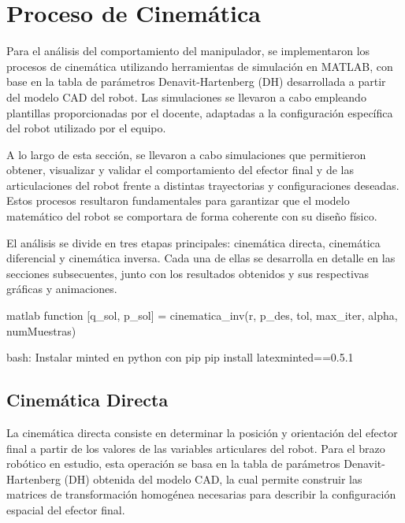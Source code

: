\section{Proceso de Cinemática} \label{sec:proceso_cinematica}

Para el análisis del comportamiento del manipulador, se implementaron los procesos de cinemática utilizando herramientas de simulación en MATLAB, con base en la tabla de parámetros Denavit-Hartenberg (DH) desarrollada a partir del modelo CAD del robot.
Las simulaciones se llevaron a cabo empleando plantillas proporcionadas por el docente, adaptadas a la configuración específica del robot utilizado por el equipo.

A lo largo de esta sección, se llevaron a cabo simulaciones que permitieron obtener, visualizar y validar el comportamiento del efector final y de las articulaciones del robot frente a distintas trayectorias y configuraciones deseadas. Estos procesos resultaron fundamentales para garantizar que el modelo matemático del robot se comportara de forma coherente con su diseño físico.

El análisis se divide en tres etapas principales: cinemática directa, cinemática diferencial y cinemática inversa. Cada una de ellas se desarrolla en detalle en las secciones subsecuentes, junto con los resultados obtenidos y sus respectivas gráficas y animaciones.

\begin{matlabcode}{matlab}
	function [q_sol, p_sol] = cinematica_inv(r, p_des, tol, max_iter, alpha, numMuestras)
\end{matlabcode}

\begin{terminal}{bash: Instalar minted en python con pip}
	pip install latexminted==0.5.1
\end{terminal}

\subsection{Cinemática Directa} \label{subsec:cinematica_directa}

La cinemática directa consiste en determinar la posición y orientación del efector final a partir de los valores de las variables articulares del robot. Para el brazo robótico en estudio, esta operación se basa en la tabla de parámetros Denavit-Hartenberg (DH) obtenida del modelo CAD, la cual permite construir las matrices de transformación homogénea necesarias para describir la configuración espacial del efector final. \\

